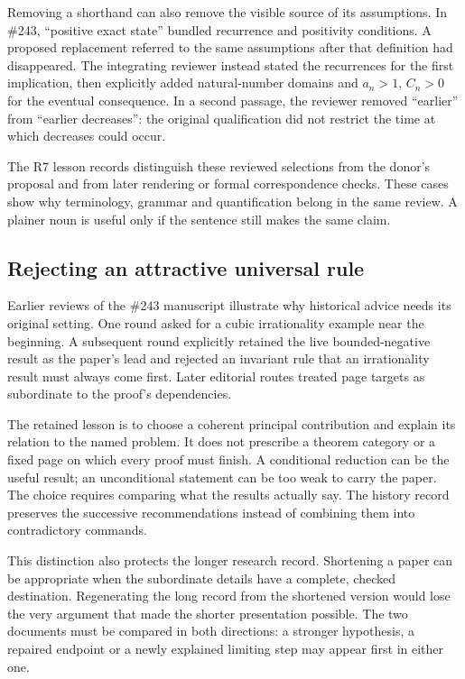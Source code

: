 Removing a shorthand can also remove the visible source of its assumptions.
In \#243, ``positive exact state'' bundled recurrence and positivity
conditions. A proposed replacement referred to the same assumptions after
that definition had disappeared. The integrating reviewer instead stated the
recurrences for the first implication, then explicitly added natural-number
domains and $a_n>1$, $C_n>0$ for the eventual consequence. In a second passage,
the reviewer removed ``earlier'' from ``earlier decreases'': the original
qualification did not restrict the time at which decreases could occur.

The R7 lesson records distinguish these reviewed selections from the donor's
proposal and from later rendering or formal correspondence checks. These
cases show why terminology, grammar and quantification belong in the same
review. A plainer noun is useful only if the sentence still makes the same
claim.

\subsection{Rejecting an attractive universal rule}

Earlier reviews of the \#243 manuscript illustrate why historical advice
needs its original setting. One round asked for a cubic irrationality example
near the beginning. A subsequent round explicitly retained the live
bounded-negative result as the paper's lead and rejected an invariant rule
that an irrationality result must always come first. Later editorial routes
treated page targets as subordinate to the proof's dependencies.

The retained lesson is to choose a coherent principal contribution and explain
its relation to the named problem. It does not prescribe a theorem category
or a fixed page on which every proof must finish. A conditional reduction
can be the useful result; an unconditional statement can be too weak to carry
the paper. The choice requires comparing what the results actually say. The
history record preserves the successive recommendations instead of combining
them into contradictory commands.

This distinction also protects the longer research record. Shortening a
paper can be appropriate when the subordinate details have a complete,
checked destination. Regenerating the long record from the shortened version
would lose the very argument that made the shorter presentation possible.
The two documents must be compared in both directions: a stronger hypothesis,
a repaired endpoint or a newly explained limiting step may appear first in
either one.

